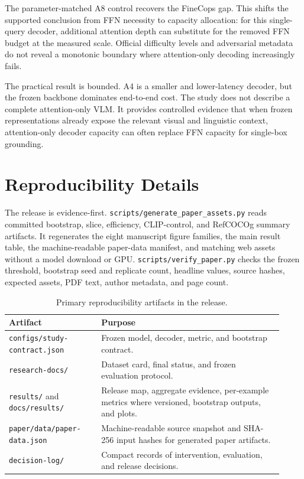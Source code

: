 \documentclass[10pt]{article}
\begin{document}
The parameter-matched A8 control recovers the FineCops gap. This shifts the
supported conclusion from FFN necessity to capacity allocation: for this
single-query decoder, additional attention depth can substitute for the
removed FFN budget at the measured scale. Official difficulty levels and
adversarial metadata do not reveal a monotonic boundary where attention-only
decoding increasingly fails.

The practical result is bounded. A4 is a smaller and lower-latency decoder, but
the frozen backbone dominates end-to-end cost. The study does not describe a
complete attention-only VLM. It provides controlled evidence that when frozen
representations already expose the relevant visual and linguistic context,
attention-only decoder capacity can often replace FFN capacity for single-box
grounding.

\appendix

\section{Reproducibility Details}\label{reproducibility-details}

The release is evidence-first. \texttt{scripts/generate\_paper\_assets.py}
reads committed bootstrap, slice, efficiency, CLIP-control, and RefCOCOg
summary artifacts. It regenerates the eight manuscript figure families, the
main result table, the machine-readable paper-data manifest, and matching web
assets without a model download or GPU. \texttt{scripts/verify\_paper.py}
checks the frozen threshold, bootstrap seed and replicate count, headline
values, source hashes, expected assets, PDF text, author metadata, and page
count.

\begin{table}[H]
\centering
\small
\setlength{\tabcolsep}{5pt}
\begin{tabular}{p{0.31\linewidth}p{0.61\linewidth}}
\toprule
Artifact & Purpose \\
\midrule
\texttt{configs/study-contract.json} & Frozen model, decoder, metric, and bootstrap contract. \\
\texttt{research-docs/} & Dataset card, final status, and frozen evaluation protocol. \\
\texttt{results/} and \texttt{docs/results/} & Release map, aggregate evidence, per-example metrics where versioned, bootstrap outputs, and plots. \\
\texttt{paper/data/paper-data.json} & Machine-readable source snapshot and SHA-256 input hashes for generated paper artifacts. \\
\texttt{decision-log/} & Compact records of intervention, evaluation, and release decisions. \\
\bottomrule
\end{tabular}
\caption{Primary reproducibility artifacts in the release.}
\label{tab:reproducibility-artifacts}
\end{table}
\end{document}
